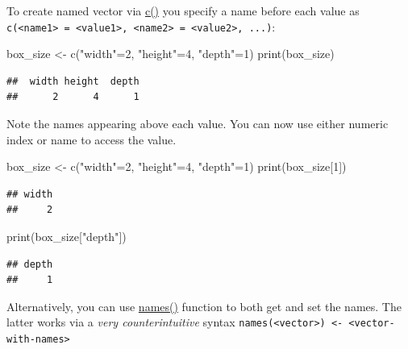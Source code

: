 \documentclass[
]{book}
\newenvironment{Shaded}{\begin{snugshade}}{\end{snugshade}}
\newcommand{\DecValTok}[1]{\textcolor[rgb]{0.00,0.00,0.81}{#1}}
\newcommand{\FunctionTok}[1]{\textcolor[rgb]{0.00,0.00,0.00}{#1}}
\newcommand{\NormalTok}[1]{#1}
\newcommand{\OtherTok}[1]{\textcolor[rgb]{0.56,0.35,0.01}{#1}}
\newcommand{\StringTok}[1]{\textcolor[rgb]{0.31,0.60,0.02}{#1}}
\begin{document}
To create named vector via \href{https://stat.ethz.ch/R-manual/R-devel/library/base/html/c.html}{c()} you specify a name before each value as \texttt{c(\textless{}name1\textgreater{}\ =\ \textless{}value1\textgreater{},\ \textless{}name2\textgreater{}\ =\ \textless{}value2\textgreater{},\ ...)}:

\begin{Shaded}
\begin{Highlighting}[]
\NormalTok{box\_size }\OtherTok{\textless{}{-}} \FunctionTok{c}\NormalTok{(}\StringTok{"width"}\OtherTok{=}\DecValTok{2}\NormalTok{, }\StringTok{"height"}\OtherTok{=}\DecValTok{4}\NormalTok{, }\StringTok{"depth"}\OtherTok{=}\DecValTok{1}\NormalTok{) }
\FunctionTok{print}\NormalTok{(box\_size)}
\end{Highlighting}
\end{Shaded}

\begin{verbatim}
##  width height  depth 
##      2      4      1
\end{verbatim}

Note the names appearing above each value. You can now use either numeric index or name to access the value.

\begin{Shaded}
\begin{Highlighting}[]
\NormalTok{box\_size }\OtherTok{\textless{}{-}} \FunctionTok{c}\NormalTok{(}\StringTok{"width"}\OtherTok{=}\DecValTok{2}\NormalTok{, }\StringTok{"height"}\OtherTok{=}\DecValTok{4}\NormalTok{, }\StringTok{"depth"}\OtherTok{=}\DecValTok{1}\NormalTok{) }
\FunctionTok{print}\NormalTok{(box\_size[}\DecValTok{1}\NormalTok{])}
\end{Highlighting}
\end{Shaded}

\begin{verbatim}
## width 
##     2
\end{verbatim}

\begin{Shaded}
\begin{Highlighting}[]
\FunctionTok{print}\NormalTok{(box\_size[}\StringTok{"depth"}\NormalTok{])}
\end{Highlighting}
\end{Shaded}

\begin{verbatim}
## depth 
##     1
\end{verbatim}

Alternatively, you can use \href{https://stat.ethz.ch/R-manual/R-devel/library/base/html/names.html}{names()} function to both get and set the names. The latter works via a \emph{very counterintuitive} syntax \texttt{names(\textless{}vector\textgreater{})\ \textless{}-\ \textless{}vector-with-names\textgreater{}}
\end{document}
